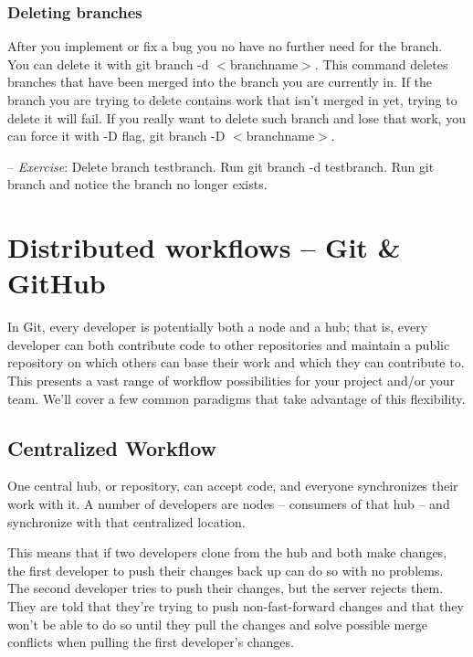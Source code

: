 \documentclass[12pt,a4]{article}
\newcommand{\ilcode}[1]{\textcolor[RGB]{160, 110, 220}{#1}}
\begin{document}
\subsubsection{Deleting branches}
After you implement or fix a bug you no have no further need for the branch. You
can delete it with \ilcode{git branch -d $<$branchname$>$}. This command deletes
branches that have been merged into the branch you are currently in. If the
branch you are trying to delete contains work that isn't merged in yet, trying
to delete it will fail. If you really want to delete such branch and lose that
work, you can force it with \ilcode{-D} flag, \ilcode{git branch -D
$<$branchname$>$}.

{\sf -- \emph{Exercise}:} Delete branch testbranch. Run \ilcode{git branch -d
testbranch}. Run \ilcode{git branch} and notice the branch no longer exists.

\section{Distributed workflows -- Git \& GitHub}
In Git, every developer is potentially both a node and a hub; that is, every
developer can both contribute code to other repositories and maintain a public
repository on which others can base their work and which they can contribute to.
This presents a vast range of workflow possibilities for your project and/or
your team. We'll cover a few common paradigms that take advantage of this
flexibility.

\subsection{Centralized Workflow}

\begin{center}
\end{center}

One central hub, or repository, can accept code, and everyone synchronizes their
work with it. A number of developers are nodes -- consumers of that hub -- and
synchronize with that centralized location.

This means that if two developers clone from the hub and both make changes, the
first developer to push their changes back up can do so with no problems. The
second developer tries to push their changes, but the server rejects them. They
are told that they're trying to push non-fast-forward changes and that they
won't be able to do so until they pull the changes and solve possible merge
conflicts when pulling the first developer's changes.
\end{document}
